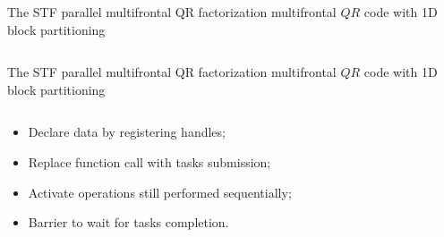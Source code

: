 \begin{frame}[fragile,t]{The STF parallel multifrontal QR factorization}
   multifrontal $QR$ code with 1D block partitioning

  \begin{columns}[t]
    \begin{column}{0.45\textwidth}
    \end{column}
    \begin{column}{0.55\textwidth}
      
    \end{column}
  \end{columns}
\end{frame}

\begin{frame}[fragile,t]{The STF parallel multifrontal QR factorization}
   multifrontal $QR$ code with 1D block partitioning

  \begin{columns}[t]
    \begin{column}{0.45\textwidth}
      \begin{itemize}
      \item Declare data by registering handles;
      \item Replace function call with tasks submission;
      \item Activate operations still performed sequentially;
      \item Barrier to wait for tasks completion.
      \end{itemize}
    \end{column}
    \begin{column}{0.55\textwidth}
      
    \end{column}
  \end{columns}
\end{frame}


